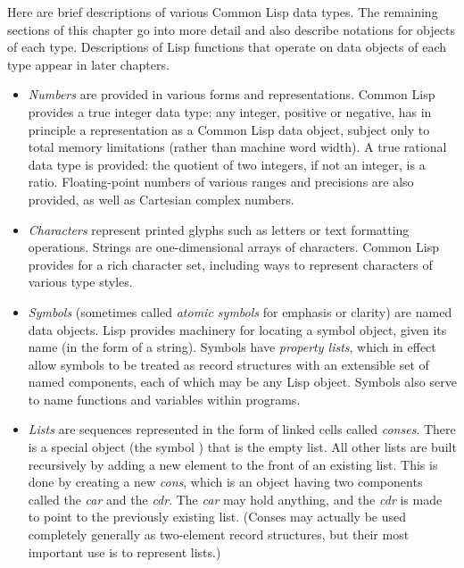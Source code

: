 Here are brief descriptions of various Common Lisp data types.
The remaining sections of this chapter go into more detail
and also describe notations for objects
of each type.  Descriptions of Lisp functions that operate
on data objects of each type appear in later chapters.

\begin{itemize}
\item
\emph{Numbers} are provided in various forms and representations.
Common Lisp provides a true integer data type: any integer,
positive or negative, has in principle a representation as a
Common Lisp data object, subject only to total memory limitations (rather than
machine word width).
A true rational data type is provided: the quotient of two integers,
if not an integer, is a ratio.
Floating-point numbers of various ranges and precisions are also
provided, as well as
Cartesian complex numbers.

\item
\emph{Characters} represent printed glyphs such as letters
or text formatting operations.  Strings are one-dimensional
arrays of characters.
Common Lisp provides for a rich character set, including ways to
represent characters of various type styles.

\item
\emph{Symbols} (sometimes called \emph{atomic symbols} for emphasis
or clarity) are named data objects.  Lisp provides machinery
for locating a symbol object, given its name (in the form
of a string).  Symbols have \emph{property lists}, which in effect
allow symbols to be treated as record structures with an extensible
set of named components, each of which may be any Lisp object.
Symbols also serve to name functions and variables within programs.

\item
\emph{Lists} are sequences represented in the form of linked cells
called \emph{conses}.  There is a special object (the symbol {\nil})
that is the empty list.  All other lists are built recursively by adding a new
element to the front of an existing list.  This is done by
creating a new \emph{cons}, which is an object having two components
called the \emph{car} and the \emph{cdr}.  The \emph{car} may hold anything,
and the \emph{cdr} is made to point to the previously existing list.
(Conses may actually be used completely generally as two-element
record structures, but their most important use is to represent
lists.)


\end{itemize}
